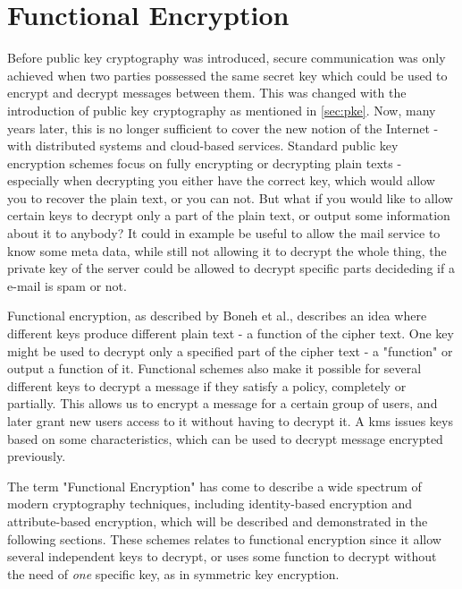 \section{Functional Encryption}
Before public key cryptography was introduced, secure communication was only achieved when two parties possessed the same secret key which could be used to encrypt and decrypt messages between them. This was changed with the introduction of public key cryptography as mentioned in \ref{sec:pke}. Now, many years later, this is no longer sufficient to cover the new notion of the Internet - with distributed systems and cloud-based services. Standard public key encryption schemes focus on fully encrypting or decrypting plain texts - especially when decrypting you either have the correct key, which would allow you to recover the plain text, or you can not. But what if you would like to allow certain keys to decrypt only a part of the plain text, or output some information about it to anybody? It could in example be useful to allow the mail service to know some meta data, while still not allowing it to decrypt the whole thing, the private key of the server could be allowed to decrypt specific parts decideding if a e-mail is spam or not.
\par Functional encryption, as described by Boneh et al.\cite{boneh2012functional}, describes an idea where different keys produce different plain text - a function of the cipher text. One key might be used to decrypt only a specified part of the cipher text - a "function" or output a function of it. Functional schemes also make it possible for several different keys to decrypt a message if they satisfy a policy, completely or partially. This allows us to encrypt a message for a certain group of users, and later grant new users access to it without having to decrypt it. A \gls{kms} issues keys based on some characteristics, which can be used to decrypt message encrypted previously. 
\par The term "Functional Encryption" has come to describe a wide spectrum of modern cryptography techniques, including identity-based encryption and attribute-based encryption, which will be described and demonstrated in the following sections. These schemes relates to functional encryption since it allow several independent keys to decrypt, or uses some function to decrypt without the need of \emph{one} specific key, as in symmetric key encryption.


